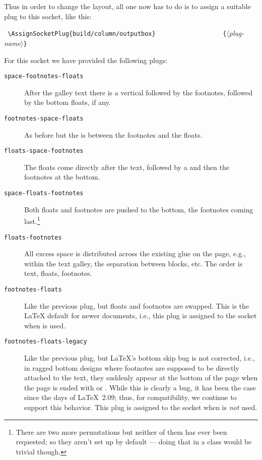 \documentclass{ltnews}
\providecommand\plug[1]{\texttt{#1}}
\providecommand\meta[1]{$\langle$\textrm{\itshape#1}$\rangle$}
\begin{document}
Thus in order to change the layout, all one now has to do is to assign
a suitable plug to this socket, like this:
\begin{flushleft}
  \verb= \AssignSocketPlug{build/column/outputbox}=
  \verb=                  {=\meta{plug-name}\verb=}=
\end{flushleft}
%
For this socket we have provided the following plugs:
\begin{description}
\item[\plug{space-footnotes-floats}]

   After the galley text there is a vertical 
   followed by the footnotes, followed by the bottom floats, if any.

\item[\plug{footnotes-space-floats}]

   As before but the  is between the footnotes and the floats.

\item[\plug{floats-space-footnotes}]

   The floats come directly after the text, followed by a 
   and then the footnotes at the bottom.

\item[\plug{space-floats-footnotes}]

   Both floats and footnotes are pushed to the bottom, the footnotes
   coming last.\footnote{There are two more permutations but neither
   of them has ever been requested; so they aren't set up by default
   --- doing that in a class would be trivial though.}

\item[\plug{floats-footnotes}]

   All excess space is distributed across the existing glue on the
   page, e.g., within the text galley, the separation between blocks,
   etc.  The order is text, floats, footnotes.

\item[\plug{footnotes-floats}]

   Like the previous plug, but floats and footnotes are swapped. This is
   the \LaTeX{} default for newer documents, i.e., this plug is
   assigned to the socket when  is used.

\item[\plug{footnotes-floats-legacy}]

   Like the previous plug, but \LaTeX{}'s bottom skip bug is not
   corrected, i.e., in ragged bottom designs where footnotes are
   supposed to be directly attached to the text, they suddenly appear
   at the bottom of the page when the page is ended with 
   or .  While this is clearly a bug, it has been the
   case since the days of \LaTeX~2.09; thus, for compatibility, we
   continue to support this behavior.  This plug is
   assigned to the socket when  is \emph{not} used.
\end{description}
\end{document}
